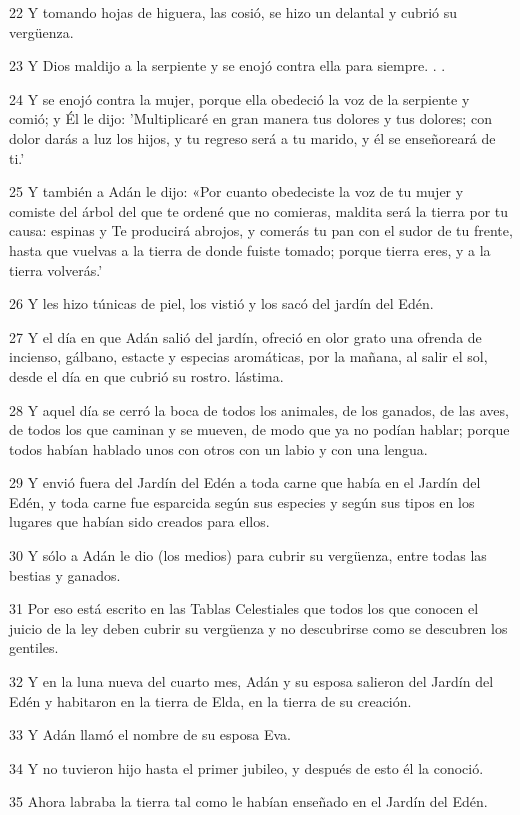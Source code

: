 \par 22 Y tomando hojas de higuera, las cosió, se hizo un delantal y cubrió su vergüenza.
\par 23 Y Dios maldijo a la serpiente y se enojó contra ella para siempre. . .
\par 24 Y se enojó contra la mujer, porque ella obedeció la voz de la serpiente y comió; y Él le dijo: 'Multiplicaré en gran manera tus dolores y tus dolores; con dolor darás a luz los hijos, y tu regreso será a tu marido, y él se enseñoreará de ti.'
\par 25 Y también a Adán le dijo: «Por cuanto obedeciste la voz de tu mujer y comiste del árbol del que te ordené que no comieras, maldita será la tierra por tu causa: espinas y Te producirá abrojos, y comerás tu pan con el sudor de tu frente, hasta que vuelvas a la tierra de donde fuiste tomado; porque tierra eres, y a la tierra volverás.'
\par 26 Y les hizo túnicas de piel, los vistió y los sacó del jardín del Edén.
\par 27 Y el día en que Adán salió del jardín, ofreció en olor grato una ofrenda de incienso, gálbano, estacte y especias aromáticas, por la mañana, al salir el sol, desde el día en que cubrió su rostro. lástima.
\par 28 Y aquel día se cerró la boca de todos los animales, de los ganados, de las aves, de todos los que caminan y se mueven, de modo que ya no podían hablar; porque todos habían hablado unos con otros con un labio y con una lengua.
\par 29 Y envió fuera del Jardín del Edén a toda carne que había en el Jardín del Edén, y toda carne fue esparcida según sus especies y según sus tipos en los lugares que habían sido creados para ellos.
\par 30 Y sólo a Adán le dio (los medios) para cubrir su vergüenza, entre todas las bestias y ganados.
\par 31 Por eso está escrito en las Tablas Celestiales que todos los que conocen el juicio de la ley deben cubrir su vergüenza y no descubrirse como se descubren los gentiles.
\par 32 Y en la luna nueva del cuarto mes, Adán y su esposa salieron del Jardín del Edén y habitaron en la tierra de Elda, en la tierra de su creación.
\par 33 Y Adán llamó el nombre de su esposa Eva.
\par 34 Y no tuvieron hijo hasta el primer jubileo, y después de esto él la conoció.
\par 35 Ahora labraba la tierra tal como le habían enseñado en el Jardín del Edén.

